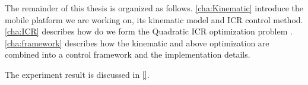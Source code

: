 The remainder of this thesis is organized as follows.
\cref{cha:Kinematic} introduce the mobile platform we are working on, its kinematic model and ICR control method.
\cref{cha:ICR} describes how do we form the Quadratic ICR optimization problem .
\cref{cha:framework} describes how the kinematic and above optimization are combined into a control framework and the implementation details.

The experiment result is discussed in \cref{}.